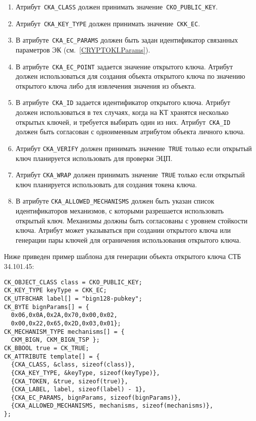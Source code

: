 \begin{enumerate}
\item
Атрибут~\verb|CKA_CLASS| должен принимать значение~\verb|CKO_PUBLIC_KEY|.

\item
Атрибут~\verb|CKA_KEY_TYPE| должен принимать значение~\verb|CKK_EC|.

\item
В атрибуте~\verb|CKA_EC_PARAMS| должен быть задан идентификатор связанных 
параметров ЭК (см.~\ref{CRYPTOKI.Params}).

\item
В атрибуте~\verb|CKA_EC_POINT| задается значение открытого ключа. 
Атрибут должен использоваться для создания объекта открытого ключа 
по значению открытого ключа либо для извлечения значения из объекта. 

\item
В атрибуте~\verb|CKA_ID| задается идентификатор открытого ключа. 
Атрибут должен использоваться в тех случаях, когда на КТ  
хранятся несколько открытых ключей, и требуется выбирать один из них. 
%
Атрибут~\verb|CKA_ID| должен быть согласован с одноименным атрибутом 
объекта личного ключа.

\item
Атрибут \verb|CKA_VERIFY| должен принимать значение~\texttt{TRUE} 
только если открытый ключ планируется использовать для проверки ЭЦП.


\item
Атрибут \verb|CKA_WRAP| должен принимать значение~\texttt{TRUE} 
только если открытый ключ планируется использовать для создания токена 
ключа.


\item
В атрибуте \verb|CKA_ALLOWED_MECHANISMS| должен быть указан список 
идентификаторов механизмов, с которыми разрешается использовать
открытый ключ. Механизмы должны быть согласованы с уровнем стойкости 
ключа. Атрибут может указываться при создании открытого
ключа или генерации пары ключей для ограничения использования
открытого ключа. 
\end{enumerate}
 
Ниже приведен пример шаблона для генерации объекта открытого ключа СТБ 34.101.45:
\begin{verbatim}
CK_OBJECT_CLASS class = CKO_PUBLIC_KEY;
CK_KEY_TYPE keyType = CKK_EC;
CK_UTF8CHAR label[] = "bign128-pubkey";
CK_BYTE bignParams[] = {
  0x06,0x0A,0x2A,0x70,0x00,0x02,
  0x00,0x22,0x65,0x2D,0x03,0x01};
CK_MECHANISM_TYPE mechanisms[] = {
  CKM_BIGN, CKM_BIGN_TSP };
CK_BBOOL true = CK_TRUE;
CK_ATTRIBUTE template[] = {
  {CKA_CLASS, &class, sizeof(class)},
  {CKA_KEY_TYPE, &keyType, sizeof(keyType)},
  {CKA_TOKEN, &true, sizeof(true)},
  {CKA_LABEL, label, sizeof(label) - 1},
  {CKA_EC_PARAMS, bignParams, sizeof(bignParams)},
  {CKA_ALLOWED_MECHANISMS, mechanisms, sizeof(mechanisms)},
};
\end{verbatim}

